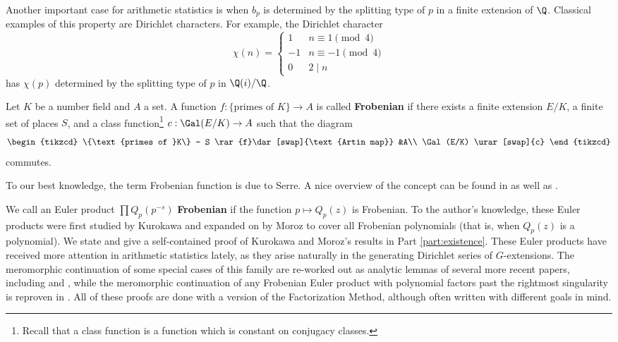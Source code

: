 \documentclass[12pt]{amsart}
\theoremstyle{plain}
\begin{document}
Another important case for arithmetic statistics is when $b_p$ is determined by the splitting type of $p$ in a finite extension of $\Q$. Classical examples of this property are Dirichlet characters. For example, the Dirichlet character
\[
\chi(n) = \begin{cases}
    1 & n\equiv 1 \pmod 4\\
    -1 & n\equiv -1\pmod 4\\
    0 & 2\mid n
\end{cases}
\]
has $\chi(p)$ determined by the splitting type of $p$ in $\Q(i)/\Q$.

\begin{definition}\label{def:frobenian}
    Let $K$ be a number field and $A$ a set. A function $f:\{\text{primes of }K\} \to A$ is called \textbf{Frobenian} if there exists a finite extension $E/K$, a finite set of places $S$, and a class function\footnote{Recall that a class function is a function which is constant on conjugacy classes.} $c:\Gal(E/K) \to A$ such that the diagram
    \[
    \begin{tikzcd}
        \{\text{primes of }K\} - S \rar{f}\dar[swap]{\text{Artin map}} &A\\
        \Gal(E/K) \urar[swap]{c}
    \end{tikzcd}
    \]
    commutes.
\end{definition}

To our best knowledge, the term Frobenian function is due to Serre. A nice overview of the concept can be found in \cite[Subsection 3.3]{serre2012} as well as \cite[Section 2]{loughran-matthiesen2019}.

We call an Euler product $\prod Q_p(p^{-s})$ \textbf{Frobenian} if the function $p\mapsto Q_p(z)$ is Frobenian. To the author's knowledge, these Euler products were first studied by Kurokawa \cite{kurokawa_1978,kurokawa_1986I,kurokawa_1986II} and expanded on by Moroz \cite{moroz_1988} to cover all Frobenian polynomials (that is, when $Q_p(z)$ is a polynomial). We state and give a self-contained proof of Kurokawa and Moroz's results in Part \ref{part:existence}. These Euler products have received more attention in arithmetic statistics lately, as they arise naturally in the generating Dirichlet series of $G$-extensions. The meromorphic continuation of some special cases of this family are re-worked out as analytic lemmas of several more recent papers, including \cite[Proposition 2]{kaplan-marcinek-takloo-bighash2015} and \cite[Proposition 2.3]{frei-loughran-newton2019}, while the meromorphic continuation of any Frobenian Euler product with polynomial factors past the rightmost singularity is reproven in \cite[Proposition 2.2]{alberts2021}. All of these proofs are done with a version of the Factorization Method, although often written with different goals in mind.
\end{document}

